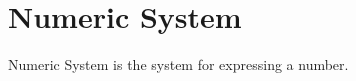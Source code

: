 \documentclass[book.tex]{subfiles}
\begin{document}
\section{Numeric System}

Numeric System is the system for expressing a number.
\end{document}
